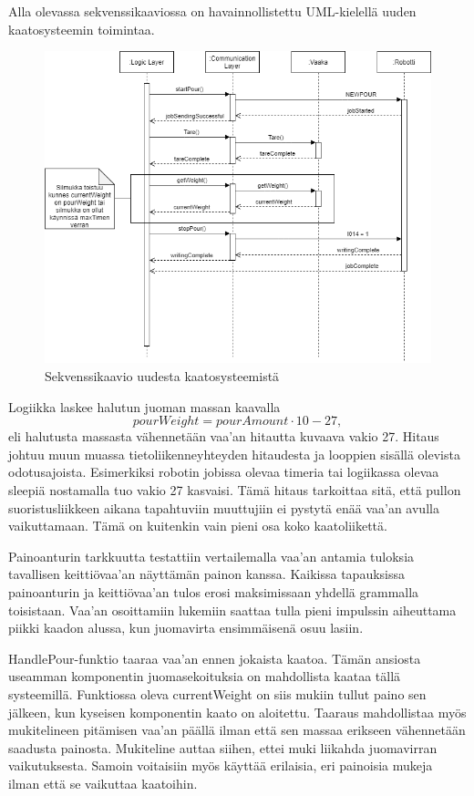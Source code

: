 Alla olevassa sekvenssikaaviossa on havainnollistettu UML-kielellä uuden kaatosysteemin toimintaa.

\begin{figure}[h]
\begin{center}
\includegraphics[scale=0.6]{img/Sequence.png}
\end{center}
\caption{Sekvenssikaavio uudesta kaatosysteemistä}
\label{fig:Sequence}
\end{figure}

\newpage

Logiikka laskee halutun juoman massan kaavalla
\[pourWeight = pourAmount \cdot 10  - 27, \]
eli halutusta massasta vähennetään vaa'an hitautta kuvaava vakio 27. Hitaus johtuu muun muassa tietoliikenneyhteyden hitaudesta ja looppien sisällä olevista odotusajoista. Esimerkiksi robotin jobissa olevaa timeria tai logiikassa olevaa sleepiä nostamalla tuo vakio 27 kasvaisi. Tämä hitaus tarkoittaa sitä, että pullon suoristusliikkeen aikana tapahtuviin muuttujiin ei pystytä enää vaa'an avulla vaikuttamaan. Tämä on kuitenkin vain pieni osa koko kaatoliikettä.

Painoanturin tarkkuutta testattiin vertailemalla vaa'an antamia tuloksia tavallisen keittiövaa'an näyttämän painon kanssa. Kaikissa tapauksissa painoanturin ja keittiövaa'an tulos erosi maksimissaan yhdellä grammalla toisistaan. Vaa'an osoittamiin lukemiin saattaa tulla pieni impulssin aiheuttama piikki kaadon alussa, kun juomavirta ensimmäisenä osuu lasiin.

HandlePour-funktio taaraa vaa'an ennen jokaista kaatoa. Tämän ansiosta useamman komponentin juomasekoituksia on mahdollista kaataa tällä systeemillä. Funktiossa oleva currentWeight on siis mukiin tullut paino sen jälkeen, kun kyseisen komponentin kaato on aloitettu. Taaraus mahdollistaa myös mukitelineen pitämisen vaa'an päällä ilman että sen massaa erikseen vähennetään saadusta painosta. Mukiteline auttaa siihen, ettei muki liikahda juomavirran vaikutuksesta. Samoin voitaisiin myös käyttää erilaisia, eri painoisia mukeja ilman että se vaikuttaa kaatoihin.

